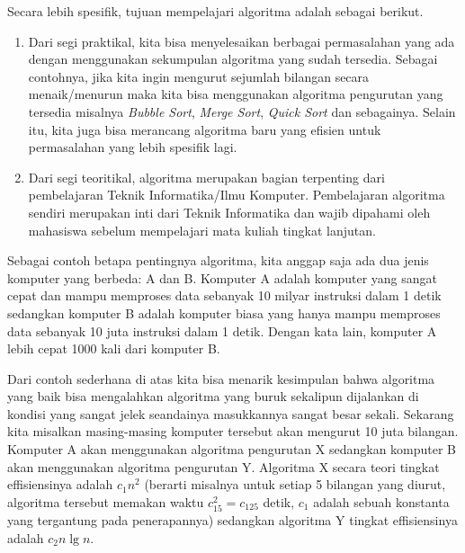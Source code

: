Secara lebih spesifik, tujuan mempelajari algoritma adalah sebagai berikut.
\begin{enumerate}
	\item Dari segi praktikal, kita bisa menyelesaikan berbagai permasalahan yang ada dengan menggunakan sekumpulan algoritma yang sudah tersedia. Sebagai contohnya, jika kita ingin mengurut sejumlah bilangan secara menaik/menurun maka kita bisa menggunakan algoritma pengurutan yang tersedia misalnya \textit{Bubble Sort}, \textit{Merge Sort}, \textit{Quick Sort} dan sebagainya. Selain itu, kita juga bisa merancang algoritma baru yang efisien untuk permasalahan yang lebih spesifik lagi.
	\item Dari segi teoritikal, algoritma merupakan bagian terpenting dari pembelajaran Teknik Informatika/Ilmu Komputer. Pembelajaran algoritma sendiri merupakan inti dari Teknik Informatika dan wajib dipahami oleh mahasiswa sebelum mempelajari mata kuliah tingkat lanjutan.
\end{enumerate}

Sebagai contoh betapa pentingnya algoritma, kita anggap saja ada dua jenis komputer yang berbeda: A dan B. Komputer A adalah komputer yang sangat cepat dan mampu memproses data sebanyak 10 milyar instruksi dalam 1 detik sedangkan komputer B adalah komputer biasa yang hanya mampu memproses data sebanyak 10 juta instruksi dalam 1 detik. Dengan kata lain, komputer A lebih cepat 1000 kali dari komputer B.

Dari contoh sederhana di atas kita bisa menarik kesimpulan bahwa algoritma yang baik bisa mengalahkan algoritma yang buruk sekalipun dijalankan di kondisi yang sangat jelek seandainya masukkannya sangat besar sekali. 
Sekarang kita misalkan masing-masing komputer tersebut akan mengurut 10 juta bilangan. Komputer A akan menggunakan algoritma pengurutan X sedangkan komputer B akan menggunakan algoritma pengurutan Y. Algoritma X secara teori tingkat effisiensinya adalah $c_1n^2$ (berarti misalnya untuk setiap 5 bilangan yang diurut, algoritma tersebut memakan waktu $c_15^2 = c_125$ detik, $c_1$ adalah sebuah konstanta yang tergantung pada penerapannya) sedangkan algoritma Y tingkat effisiensinya adalah $c_2n\lg n$. 

